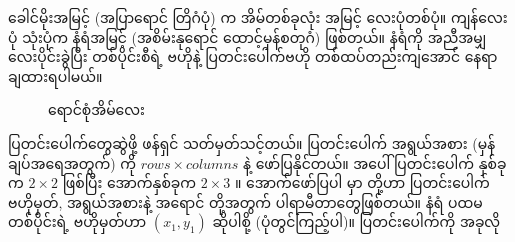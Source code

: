 ခေါင်မိုးအမြင့် (အပြာရောင် တြိဂံပုံ) က အိမ်တစ်ခုလုံး အမြင့် လေးပုံတစ်ပုံ။ ကျန်လေးပုံ သုံးပုံက နံရံအမြင့် (အစိမ်းနုရောင် ထောင့်မှန်စတုဂံ) ဖြစ်တယ်။ နံရံကို အညီအမျှ လေးပိုင်းခွဲပြီး တစ်ပိုင်းစီရဲ့ ဗဟိုနဲ့ ပြတင်းပေါက်ဗဟို တစ်ထပ်တည်းကျအောင် နေရာချထားရပါမယ်။ 

\begin{figure}[b!]
\caption{ရောင်စုံအိမ်လေး} 
\label{fig:colorful_house}
\end{figure}

ပြတင်းပေါက်တွေဆွဲဖို့  ဖန်ရှင် သတ်မှတ်သင့်တယ်။ ပြတင်းပေါက် အရွယ်အစား (မှန်ချပ်အရေအတွက်) ကို $rows \times columns$ နဲ့ ဖော်ပြနိုင်တယ်။  အပေါ်ပြတင်းပေါက် နှစ်ခုက $2 \times 2$ ဖြစ်ပြီး အောက်နှစ်ခုက $2 \times 3$ ။  အောက်ဖော်ပြပါ  မှာ \fEn{,} \fEn{,} \fEn{,}  တို့ဟာ ပြတင်းပေါက် ဗဟိုမှတ်, အရွယ်အစားနဲ့ အရောင် တို့အတွက် ပါရာမီတာတွေဖြစ်တယ်။ နံရံ ပထမတစ်ပိုင်းရဲ့ ဗဟိုမှတ်ဟာ $(x_1, y_1)$ ဆိုပါစို့ (ပုံတွင်ကြည့်ပါ)။ ပြတင်းပေါက်ကို အခုလို

